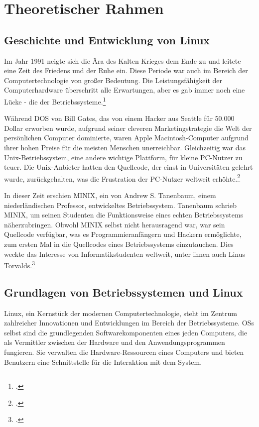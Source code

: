 
\section{Theoretischer Rahmen}
\subsection{Geschichte und Entwicklung von Linux}
Im Jahr 1991 neigte sich die Ära des Kalten Krieges dem Ende zu und leitete eine Zeit des Friedens und der Ruhe ein. Diese Periode war auch im Bereich der
Computertechnologie von großer Bedeutung. Die Leistungsfähigkeit der
Computerhardware überschritt alle Erwartungen, aber es gab immer noch eine Lücke
- die der Betriebssysteme.\footcite[1]{Hasan2004}

Während DOS von Bill Gates, das von einem Hacker aus Seattle für 50.000 Dollar
erworben wurde, aufgrund seiner cleveren Marketingstrategie die Welt der
persönlichen Computer dominierte, waren Apple Macintosh-Computer aufgrund ihrer
hohen Preise für die meisten Menschen unerreichbar. Gleichzeitig war das
Unix-Betriebssystem, eine andere wichtige Plattform, für kleine PC-Nutzer zu
teuer. Die Unix-Anbieter hatten den Quellcode, der einst in Universitäten
gelehrt wurde, zurückgehalten, was die Frustration der PC-Nutzer weltweit
erhöhte.\footcite[1]{Hasan2004}

In dieser Zeit erschien MINIX, ein von Andrew S\@. Tanenbaum, einem
niederländischen Professor, entwickeltes Betriebssystem. Tanenbaum schrieb MINIX,
um seinen Studenten die Funktionsweise eines echten Betriebssystems
näherzubringen. Obwohl MINIX selbst nicht herausragend war, war sein Quellcode
verfügbar, was es Programmieranfängern und Hackern ermöglichte, zum ersten Mal
in die Quellcodes eines Betriebssystems einzutauchen. Dies weckte das Interesse
von Informatikstudenten weltweit, unter ihnen auch Linus Torvalds.\footcite[1]{Hasan2004} 

\newpage

\subsection{Grundlagen von Betriebssystemen und Linux}
Linux, ein Kernstück der modernen Computertechnologie, steht im Zentrum
zahlreicher Innovationen und Entwicklungen im Bereich der Betriebssysteme.
\Glspl{OS} selbst sind die grundlegenden Softwarekomponenten eines
jeden Computers, die als Vermittler zwischen der Hardware und den
Anwendungsprogrammen fungieren. Sie verwalten die Hardware-Ressourcen eines
Computers und bieten Benutzern eine Schnittstelle für die Interaktion mit dem
System.

